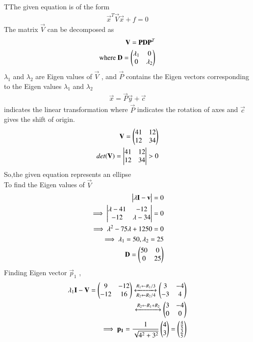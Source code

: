  
TThe given equation is of the form
\begin{align}
   \vec{x}^T\vec{V}\vec{x}+f=0
\end{align}
The matrix $\vec{V}$ can be decomposed as
\begin{align}
    \mathbf{V}=\mathbf{P}\mathbf{D}\mathbf{P}^T\label{eq:solutions/3/4/10/2}\\
    \text{where  }\mathbf{D}=\begin{pmatrix}\lambda_1&0\\0&\lambda_2\end{pmatrix}
\end{align}
$\lambda_1$ and $\lambda_2$ are Eigen values of $\vec{V}$ , and
$\vec{P}$ contains the Eigen vectors corresponding to the Eigen values $\lambda_1$ and $\lambda_2$
\begin{align}
\vec{x}=\vec{P}\vec{y}+\vec{c}
\end{align}
indicates the linear transformation where $\vec{P}$ indicates the rotation of axes and $\vec{c}$ gives the shift of origin.
\begin{align}
  \mathbf{V}=\begin{pmatrix}41&12\\12&34\end{pmatrix}\\
  det(\mathbf{V} )=\begin{vmatrix}41&12\\12&34\end{vmatrix}>0
\end{align}
So,the given equation represents an ellipse\\
To find the Eigen values of $\vec{V}$
\begin{align}
    \begin{vmatrix}\lambda\mathbf{I}-\mathbf{v}\end{vmatrix}=0\\
    \implies \begin{vmatrix}\lambda-41&-12\\-12&\lambda-34\end{vmatrix}=0\\
    \implies \lambda^2-75\lambda+1250=0\\
    \implies \lambda_1=50,\lambda_2=25\\
    \mathbf{D}=\begin{pmatrix}50&0\\0&25\end{pmatrix}
\end{align}
Finding Eigen vector $\vec{p}_1$ ,
\begin{align}
\lambda_1\mathbf{I}-\mathbf{V}= \begin{pmatrix}9&-12\\-12&16\end{pmatrix}\xleftrightarrow[R_2\leftarrow R_2/4]{R_1\leftarrow R_1/3}\begin{pmatrix}3&-4\\-3&4\end{pmatrix}\\
\xleftrightarrow[]{R_2\leftarrow R_1+R_2}\begin{pmatrix}3&-4\\0&0\end{pmatrix}\\
\implies \mathbf{p_1}=\frac{1}{\sqrt{4^2+3^2}}\begin{pmatrix}4\\3\end{pmatrix}=\begin{pmatrix}\frac{4}{5}\\\frac{3}{5}\end{pmatrix}
\end{align}
